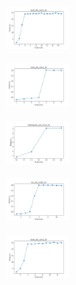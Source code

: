 \begin{figure}[H]
\begin{subfigure}
    \end{subfigure}
    \hfill
    \begin{subfigure}
        \centering
        \includegraphics[width=0.234\textwidth]{img/es/ecoli_set_const_10_589741062_time.png}
    \end{subfigure}
    \hfill
    \begin{subfigure}
        \centering
        \includegraphics[width=0.234\textwidth]{img/es/rand_set_const_10_589741062_time.png}
    \end{subfigure}
    \hfill
    \begin{subfigure}
        \centering
        \includegraphics[width=0.234\textwidth]{img/es/newthyroid_set_const_10_589741062_time.png}
    \end{subfigure}
    \hfill
    \begin{subfigure}
        \centering
        \includegraphics[width=0.234\textwidth]{img/es/iris_set_const_10_277451237_time.png}
    \end{subfigure}
    \hfill
    \begin{subfigure}
        \centering
        \includegraphics[width=0.234\textwidth]{img/es/ecoli_set_const_10_277451237_time.png}
    \end{subfigure}
    \hfill
    \begin{subfigure}

\end{subfigure}
\end{figure}
